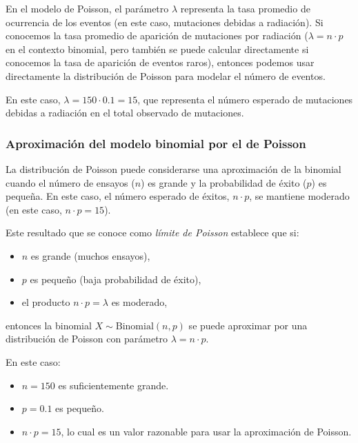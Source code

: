 \documentclass[
]{article}
\providecommand{\tightlist}{%
  \setlength{\itemsep}{0pt}\setlength{\parskip}{0pt}}
\begin{document}
En el modelo de Poisson, el parámetro \(\lambda\) representa la tasa promedio de ocurrencia de los eventos (en este caso, mutaciones debidas a radiación). Si conocemos la tasa promedio de aparición de mutaciones por radiación (\(\lambda = n \cdot p\) en el contexto binomial, pero también se puede calcular directamente si conocemos la tasa de aparición de eventos raros), entonces podemos usar directamente la distribución de Poisson para modelar el número de eventos.

En este caso, \(\lambda = 150 \cdot 0.1 = 15\), que representa el número esperado de mutaciones debidas a radiación en el total observado de mutaciones.

\subsubsection{Aproximación del modelo binomial por el de Poisson}\label{aproximaciuxf3n-del-modelo-binomial-por-el-de-poisson}

La distribución de Poisson puede considerarse una aproximación de la binomial cuando el número de ensayos (\(n\)) es grande y la probabilidad de éxito (\(p\)) es pequeña. En este caso, el número esperado de éxitos, \(n \cdot p\), se mantiene moderado (en este caso, \(n \cdot p = 15\)).

Este resultado que se conoce como \emph{límite de Poisson} establece que si:

\begin{itemize}
\tightlist
\item
  \(n\) es grande (muchos ensayos),
\item
  \(p\) es pequeño (baja probabilidad de éxito),
\item
  el producto \(n \cdot p = \lambda\) es moderado,
\end{itemize}

entonces la binomial \(X \sim \text{Binomial}(n, p)\) se puede aproximar por una distribución de Poisson con parámetro \(\lambda = n \cdot p\).

En este caso:

\begin{itemize}
\tightlist
\item
  \(n = 150\) es suficientemente grande.
\item
  \(p = 0.1\) es pequeño.
\item
  \(n \cdot p = 15\), lo cual es un valor razonable para usar la aproximación de Poisson.
\end{itemize}
\end{document}
